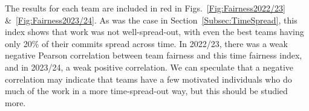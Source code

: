 \documentclass[10pt, conference]{IEEEtran}
\begin{document}
The results for each team are included in red in
Figs.~\ref{Fig:Fairness2022/23} \&~\ref{Fig:Fairness2023/24}. As was the case in
Section~\ref{Subsec:TimeSpread}, this index shows that work was not well-spread-out,
with even the best teams having only 20\% of their commits spread across time.
In 2022/23, there was a weak negative Pearson correlation between team fairness and this
time fairness index, and in 2023/24, a weak positive correlation. We can
speculate that a negative correlation may indicate that teams have a few motivated
individuals who do much of the work in a more time-spread-out way, but this should be
studied more.



\end{document}

